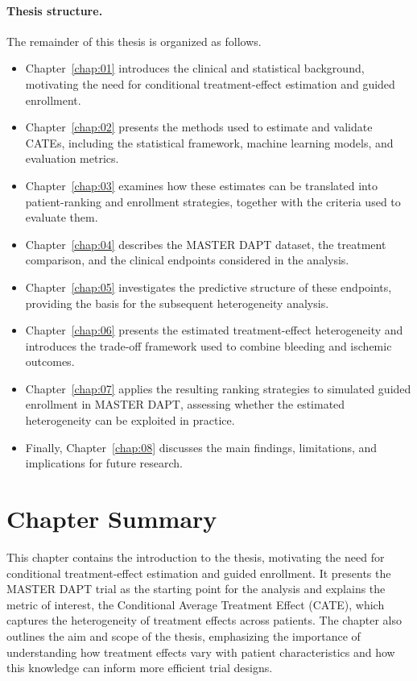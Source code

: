 \paragraph{Thesis structure.}
The remainder of this thesis is organized as follows.
\begin{itemize}
  \item Chapter~\ref{chap:01} introduces the clinical and statistical
    background, motivating the need for conditional treatment-effect
    estimation and guided enrollment.
  \item Chapter~\ref{chap:02} presents the methods used to estimate and
    validate CATEs, including the statistical framework, machine learning
    models, and evaluation metrics.
  \item Chapter~\ref{chap:03} examines how these estimates can be translated
    into patient-ranking and enrollment strategies, together with the criteria
    used to evaluate them.
  \item Chapter~\ref{chap:04} describes the MASTER DAPT dataset, the treatment
    comparison, and the clinical endpoints considered in the analysis.
  \item Chapter~\ref{chap:05} investigates the predictive structure of these
    endpoints, providing the basis for the subsequent heterogeneity analysis.
  \item Chapter~\ref{chap:06} presents the estimated treatment-effect
    heterogeneity and introduces the trade-off framework used to combine
    bleeding and ischemic outcomes.
  \item Chapter~\ref{chap:07} applies the resulting ranking strategies to
    simulated guided enrollment in MASTER DAPT, assessing whether the estimated
    heterogeneity can be exploited in practice.
  \item Finally, Chapter~\ref{chap:08} discusses the main findings,
    limitations, and implications for future research.
\end{itemize}

\section{Chapter Summary}
This chapter contains the introduction to the thesis, motivating the need 
for conditional treatment-effect estimation and guided enrollment. It presents the
MASTER DAPT trial as the starting point for the analysis and explains the 
metric of interest, the Conditional Average Treatment Effect (CATE), which captures
the heterogeneity of treatment effects across patients. The chapter also outlines the
aim and scope of the thesis, emphasizing the importance of understanding how treatment
effects vary with patient characteristics and how this knowledge can inform more efficient trial designs.